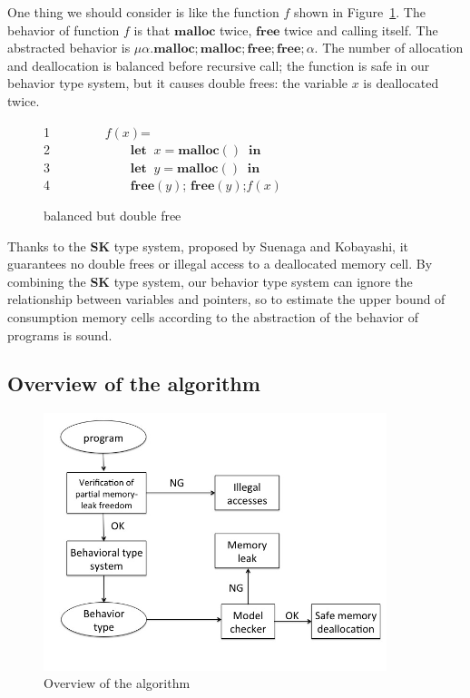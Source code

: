 \documentclass[english]{jssst_ppl} %
\newcommand\LET{\mathbf{let}\;}
\newcommand\IN{\mathbf{in}\;}
\newcommand\Rtab{\; \; \; \;}
\newcommand\MALLOC{\mathbf{malloc()}\;}
\newcommand\Malloc{\mathbf{malloc}}
\newcommand\Free{\mathbf{free}}
\newcommand\dtb{\;\;\ \;\;\ \;\;\ \;\;\  }
\theoremstyle{definition}
\begin{document}
One thing we should consider is like the function $f$ shown in Figure~\ref{ex:bbd}. The behavior of function $f$ is that $\Malloc$ twice, $\Free$ twice and calling itself. The abstracted behavior is $\mu \alpha. \Malloc;\Malloc;\Free;\Free;\alpha$. The number of allocation and deallocation is balanced before recursive call; the function is safe in our behavior type system, but it causes double frees: the variable $x$ is deallocated twice.
\begin{figure}[h]
1  \Rtab\dtb\dtb $f(x)$= \\
2  \dtb \dtb\dtb$\LET \; x = \MALLOC  \; \IN$ \\
3  \dtb \dtb\dtb$\LET \; y = \MALLOC  \; \IN$ \\
4  \dtb \dtb\dtb$\Free(y)$; $\Free(y) $;\;$f(x)$
\caption{balanced but double free}
\label{ex:bbd}
\end{figure}

Thanks to the \textbf{SK} type system, proposed by Suenaga and Kobayashi, it guarantees no double frees or illegal access to a deallocated memory cell. By combining the \textbf{SK} type system, our behavior type system can ignore the relationship between variables and pointers, so to estimate the upper bound of consumption memory cells according to the abstraction of the behavior of programs is sound.

\subsection{Overview of the algorithm}

\begin{figure}
 \centering
\includegraphics[width=10cm]{overview.jpg}
\caption{Overview of the algorithm}
\label{fig:ov}
\end{figure}
\end{document}
